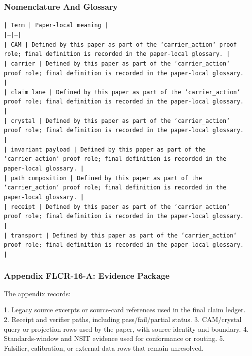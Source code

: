 \documentclass[11pt]{article}
\begin{document}
\subsubsection*{Nomenclature And Glossary}

\noindent\texttt{| Term | Paper-local meaning |}\\
\noindent\texttt{|---|---|}\\
\noindent\texttt{| CAM | Defined by this paper as part of the `carrier\_action` proof role; final definition is recorded in the paper-local glossary. |}\\
\noindent\texttt{| carrier | Defined by this paper as part of the `carrier\_action` proof role; final definition is recorded in the paper-local glossary. |}\\
\noindent\texttt{| claim lane | Defined by this paper as part of the `carrier\_action` proof role; final definition is recorded in the paper-local glossary. |}\\
\noindent\texttt{| crystal | Defined by this paper as part of the `carrier\_action` proof role; final definition is recorded in the paper-local glossary. |}\\
\noindent\texttt{| invariant payload | Defined by this paper as part of the `carrier\_action` proof role; final definition is recorded in the paper-local glossary. |}\\
\noindent\texttt{| path composition | Defined by this paper as part of the `carrier\_action` proof role; final definition is recorded in the paper-local glossary. |}\\
\noindent\texttt{| receipt | Defined by this paper as part of the `carrier\_action` proof role; final definition is recorded in the paper-local glossary. |}\\
\noindent\texttt{| transport | Defined by this paper as part of the `carrier\_action` proof role; final definition is recorded in the paper-local glossary. |}\\

\subsubsection*{Appendix FLCR-16-A: Evidence Package}

The appendix records:

1. Legacy source excerpts or source-card references used in the final claim ledger.
2. Receipt and verifier paths, including pass/fail/partial status.
3. CAM/crystal query or projection rows used by the paper, with source identity and boundary.
4. Standards-window and NSIT evidence used for conformance or routing.
5. Falsifier, calibration, or external-data rows that remain unresolved.
\end{document}

